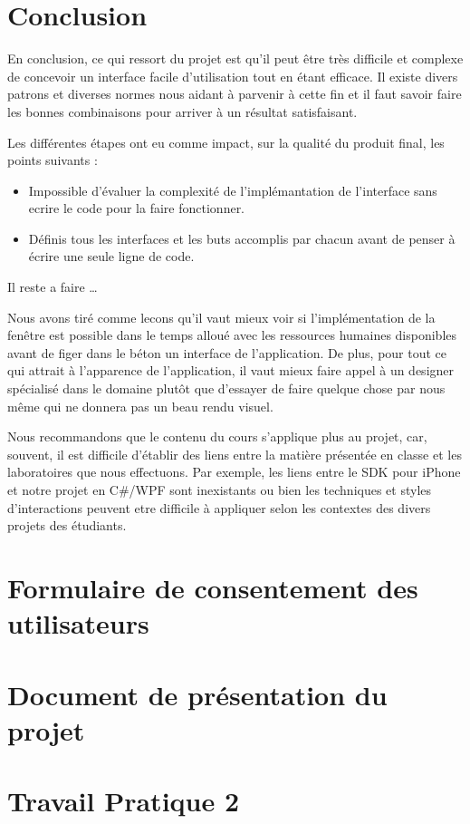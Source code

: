 \documentclass[letterpaper, oneside, 12pt, these, creativecommons]{thETS}
\begin{document}
\chapter{Conclusion}

En conclusion, ce qui ressort du projet est qu'il peut être très difficile et complexe de concevoir un interface facile d'utilisation tout en étant efficace. Il existe divers patrons et diverses normes nous aidant à parvenir à cette fin et il faut savoir faire les bonnes combinaisons pour arriver à un résultat satisfaisant. 

Les différentes étapes ont eu comme impact, sur la qualité du produit final, les points suivants :

\begin{itemize}
	\item Impossible d'évaluer la complexité de l'implémantation de l'interface sans ecrire le code pour la faire fonctionner.
	\item Définis tous les interfaces et les buts accomplis par chacun avant de penser à écrire une seule ligne de code.
\end{itemize}

Il reste a faire \dots

Nous avons tiré comme lecons qu'il vaut mieux voir si l'implémentation de la fenêtre est possible dans le temps alloué avec les ressources humaines disponibles avant de figer dans le béton un interface de l'application. De plus, pour tout ce qui attrait à l'apparence de l'application, il vaut mieux faire appel à un designer spécialisé dans le domaine plutôt que d'essayer de faire quelque chose par nous même qui ne donnera pas un beau rendu visuel.

Nous recommandons que le contenu du cours s'applique plus au projet, car, souvent, il est difficile d'établir des liens entre la matière présentée en classe et les laboratoires que nous effectuons. Par exemple, les liens entre le SDK pour iPhone et notre projet en C\#/WPF sont inexistants ou bien les techniques et styles d'interactions peuvent etre difficile à appliquer selon les contextes des divers projets des étudiants.

\appendix
\multiannexe

\chapter{Formulaire de consentement des utilisateurs}



\chapter{Document de présentation du projet}



\chapter{Travail Pratique 2}


\end{document}
